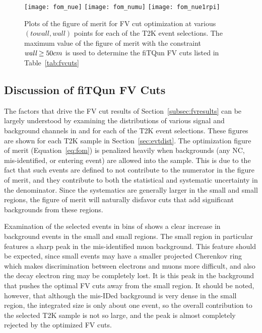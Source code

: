 \begin{figure}[h]
  \begin{center}
    \texttt{[image: fom\_nue]}
    \texttt{[image: fom\_numu]}
    \texttt{[image: fom\_nue1rpi]}
  \end{center}
  \caption{Plots of the figure of merit for FV cut optimization at various
  $(towall,wall)$ points for each of the T2K event selections. The maximum value of the figure of merit with the
  constraint $\emph{wall} \geq 50 cm$ is used to determine the fiTQun FV cuts listed in
  Table~\ref{tab:fvcuts}}
  \label{fig:fom}
\end{figure}



\subsection{Discussion of fiTQun FV Cuts}
\label{subsec:fvdiscuss}

The factors that drive the FV cut results of Section~\ref{subsec:fvresults} can
be largely understood by examining the distributions of various signal
and background channels in \wall and \towall for each of the T2K event
selections.  These figures are shown for each T2K sample in Section~\ref{sec:evtdist}.
The optimization figure of merit (Equation~\ref{eq:fom}) is
penalized heavily when backgrounds (any NC, mis-identified, or entering event)
are allowed into the sample.  This is due to the fact that such events are
defined to not contribute to the numerator in the figure of merit, and they
contribute to both the statistical and systematic uncertainty in the
denominator. Since the systematics are generally larger in the
small \wall and small \towall regions, the figure of merit will naturally
disfavor cuts that add significant backgrounds from these regions.  

Examination of the selected \nue events in bins of \towall shows a clear
increase in background events in the small \towall and small \wall regions.
The small \towall region in particular features a sharp peak in the
mis-identified muon background.  This feature should be expected, since small
\towall events may have a smaller projected Cherenkov ring which makes
discrimination between electrons and muons more difficult, and also the decay
electron ring may be completely lost. It is this peak in the background that pushes
the optimal FV cuts away from the small \towall region.  It should be noted,
however, that although the mis-IDed background is very dense in the small
\towall region, the integrated size is only about one event, so the overall
contribution to the selected \nue T2K sample is not so large, and the peak
is almost completely rejected by the optimized FV cuts.

